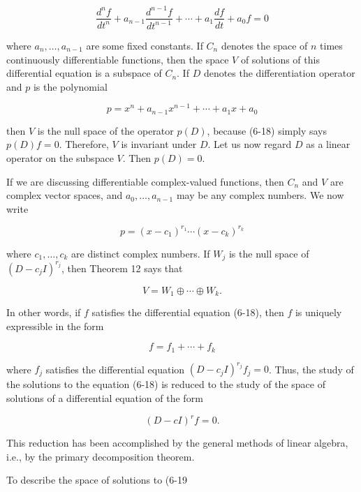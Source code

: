 \[\frac{d^{n}\!f}{dt^{n}}+a_{n-1}\frac{d^{n-1}\!f}{dt^{n-1}}+\cdots+a_{1}\frac{df}{ dt}+a_{0}\!f=0\]

where \(a_{n},\ldots,a_{n-1}\) are some fixed constants. If \(C_{n}\) denotes the space of \(n\) times continuously differentiable functions, then the space \(V\) of solutions of this differential equation is a subspace of \(C_{n}\). If \(D\) denotes the differentiation operator and \(p\) is the polynomial

\[p=x^{n}+a_{n-1}x^{n-1}+\cdots+a_{1}x+a_{0}\]

then \(V\) is the null space of the operator \(p(D)\), because (6-18) simply says \(p(D)f=0\). Therefore, \(V\) is invariant under \(D\). Let us now regard \(D\) as a linear operator on the subspace \(V\). Then \(p(D)=0\).

If we are discussing differentiable complex-valued functions, then \(C_{n}\) and \(V\) are complex vector spaces, and \(a_{0},\ldots,a_{n-1}\) may be any complex numbers. We now write

\[p=(x-c_{1})^{r_{1}}\cdots(x-c_{k})^{r_{k}}\]

where \(c_{1},\ldots,c_{k}\) are distinct complex numbers. If \(W_{j}\) is the null space of \((D-c_{j}I)^{r_{j}}\), then Theorem 12 says that

\[V=W_{1}\oplus\cdots\oplus W_{k}.\]

In other words, if \(f\) satisfies the differential equation (6-18), then \(f\) is uniquely expressible in the form

\[f=f_{1}+\cdots+f_{k}\]

where \(f_{j}\) satisfies the differential equation \((D-c_{j}I)^{r_{j}}f_{j}=0\). Thus, the study of the solutions to the equation (6-18) is reduced to the study of the space of solutions of a differential equation of the form

\[(D-cI)^{r}\!f=0.\]

This reduction has been accomplished by the general methods of linear algebra, i.e., by the primary decomposition theorem.

To describe the space of solutions to (6-19 